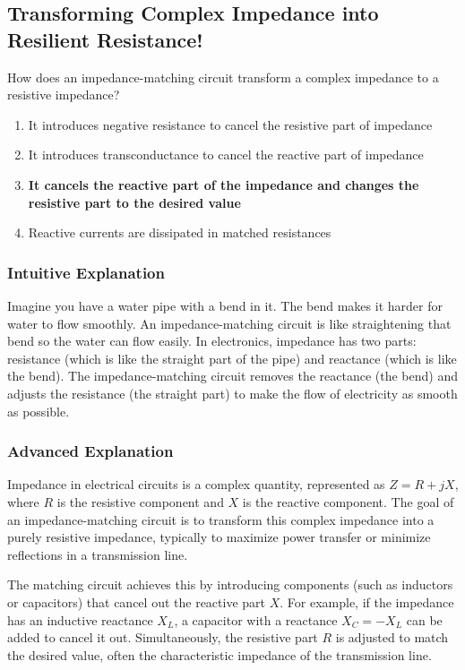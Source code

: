 \subsection{Transforming Complex Impedance into Resilient Resistance!}

\begin{tcolorbox}[colback=gray!10!white,colframe=black!75!black,title=E7C04] How does an impedance-matching circuit transform a complex impedance to a resistive impedance?
    \begin{enumerate}[label=\Alph*]
        \item It introduces negative resistance to cancel the resistive part of impedance
        \item It introduces transconductance to cancel the reactive part of impedance
        \item \textbf{It cancels the reactive part of the impedance and changes the resistive part to the desired value}
        \item Reactive currents are dissipated in matched resistances
    \end{enumerate}
\end{tcolorbox}

\subsubsection{Intuitive Explanation}
Imagine you have a water pipe with a bend in it. The bend makes it harder for water to flow smoothly. An impedance-matching circuit is like straightening that bend so the water can flow easily. In electronics, impedance has two parts: resistance (which is like the straight part of the pipe) and reactance (which is like the bend). The impedance-matching circuit removes the reactance (the bend) and adjusts the resistance (the straight part) to make the flow of electricity as smooth as possible.

\subsubsection{Advanced Explanation}
Impedance in electrical circuits is a complex quantity, represented as \( Z = R + jX \), where \( R \) is the resistive component and \( X \) is the reactive component. The goal of an impedance-matching circuit is to transform this complex impedance into a purely resistive impedance, typically to maximize power transfer or minimize reflections in a transmission line.

The matching circuit achieves this by introducing components (such as inductors or capacitors) that cancel out the reactive part \( X \). For example, if the impedance has an inductive reactance \( X_L \), a capacitor with a reactance \( X_C = -X_L \) can be added to cancel it out. Simultaneously, the resistive part \( R \) is adjusted to match the desired value, often the characteristic impedance of the transmission line.

